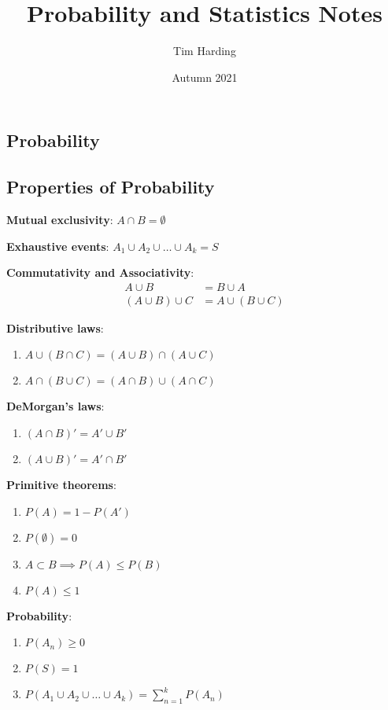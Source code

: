 \documentclass{article}
\title{Probability and Statistics Notes}
\author{Tim Harding}
\date{Autumn 2021}
\begin{document}
\begin{multicols*}{2}

\section{Probability}

\subsection{Properties of Probability}

\textbf{Mutual exclusivity}: $A \cap B = \emptyset$

\textbf{Exhaustive events}: $A_1 \cup A_2 \cup \ldots \cup A_k = S$

\textbf{Commutativity and Associativity}:
\begin{align*}
    A \cup B &= B \cup A \\
    (A \cup B) \cup C &= A \cup (B \cup C)
\end{align*}

\textbf{Distributive laws}:
\begin{enumerate}
    \item $A \cup (B \cap C) = (A \cup B) \cap (A \cup C)$
    \item $A \cap (B \cup C) = (A \cap B) \cup (A \cap C)$
\end{enumerate}

\textbf{DeMorgan's laws}:
\begin{enumerate}
    \item $(A \cap B)' = A' \cup B'$
    \item $(A \cup B)' = A' \cap B'$
\end{enumerate}

\textbf{Primitive theorems}:
\begin{enumerate}
    \item $P(A) = 1 - P(A')$
    \item $P(\emptyset) = 0$
    \item $A \subset B \implies P(A) \leq P(B)$
    \item $P(A) \leq 1$
\end{enumerate}

\textbf{Probability}:
\begin{enumerate}
    \item $P(A_n) \geq 0$
    \item $P(S) = 1$
    \item $P(A_1 \cup A_2 \cup \ldots \cup A_k) = \sum_{n=1}^k{P(A_n)}$
\end{enumerate}


\end{multicols*}
\end{document}
